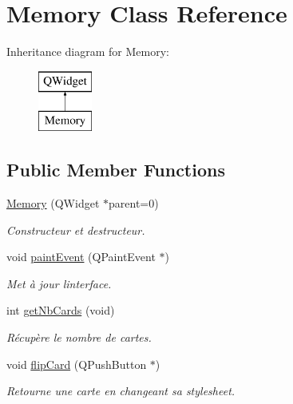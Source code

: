 \hypertarget{class_memory}{}\section{Memory Class Reference}
\label{class_memory}
Inheritance diagram for Memory\+:\begin{figure}[H]
\begin{center}
\leavevmode
\includegraphics[height=2.000000cm]{class_memory}
\end{center}
\end{figure}
\subsection*{Public Member Functions}
\begin{DoxyCompactItemize}
\item 
\hyperlink{class_memory_a243eef3e0fd8d02131e3bcca0471c931}{Memory} (Q\+Widget $\ast$parent=0)
\begin{DoxyCompactList}\small\item\em Constructeur et destructeur. \end{DoxyCompactList}\item 
void \hyperlink{class_memory_ad9a06b40d30c5ee3bbccacb37795255b}{paint\+Event} (Q\+Paint\+Event $\ast$)
\begin{DoxyCompactList}\small\item\em Met à jour l\textquotesingle{}interface. \end{DoxyCompactList}\item 
int \hyperlink{class_memory_a7c8b57775899a3782edcdf4da430ad61}{get\+Nb\+Cards} (void)
\begin{DoxyCompactList}\small\item\em Récupère le nombre de cartes. \end{DoxyCompactList}\item 
\mbox{\label{class_memory_a55cc1392f73a9b45478e7799bf1861e1}} 
void \hyperlink{class_memory_a55cc1392f73a9b45478e7799bf1861e1}{flip\+Card} (Q\+Push\+Button $\ast$)
\begin{DoxyCompactList}\small\item\em Retourne une carte en changeant sa stylesheet. \end{DoxyCompactList}\end{DoxyCompactItemize}


